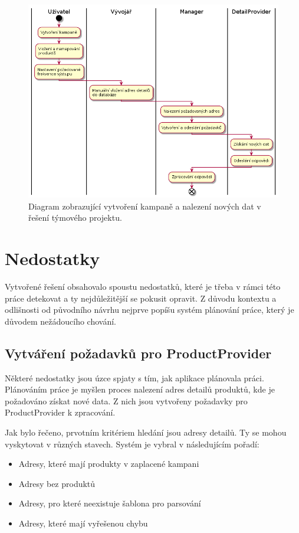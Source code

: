 \documentclass[thesis=B,czech]{FITthesis}[2012/06/26]
\begin{document}
\begin{figure}[h]\centering
 	\includegraphics[width=1.0\textwidth]{resources/legacy-process-activity}
	\caption[Diagram zobrazující vytvoření kampaně a nalezení nových dat v původním řešení týmového projektu]
	{Diagram zobrazující vytvoření kampaně a nalezení nových dat v řešení týmového projektu.}\label{fig:legacyprocess-activity}
\end{figure}

\section{Nedostatky}
Vytvořené řešení obsahovalo spoustu nedostatků, které je třeba v rámci této práce detekovat a ty nejdůležitější se pokusit opravit.
Z důvodu kontextu a odlišnosti od původního návrhu nejprve popíšu systém plánování práce, který je důvodem nežádoucího chování.

\subsection{Vytváření požadavků pro ProductProvider}
Některé nedostatky jsou úzce spjaty s tím, jak aplikace plánovala práci. Plánováním práce je myšlen proces
nalezení adres detailů produktů, kde je požadováno získat nové data. Z nich jsou vytvořeny požadavky pro ProductProvider k zpracování.
\par
Jak bylo řečeno, prvotním kritériem hledání jsou adresy detailů. Ty se mohou vyskytovat v různých stavech. Systém je vybral v 
následujícím pořadí:

\begin{itemize}
\item Adresy, které mají produkty v zaplacené kampani
\item Adresy bez produktů
\item Adresy, pro které neexistuje šablona pro parsování
\item Adresy, které mají vyřešenou chybu
\end{itemize}
\end{document}
